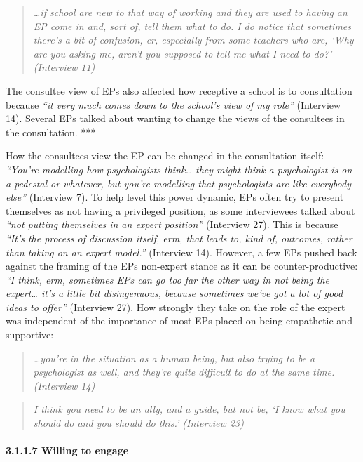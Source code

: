 \documentclass[
  english,
  man]{apa7}
\let\oldparagraph\paragraph
\renewcommand{\paragraph}[1]{\oldparagraph{#1}\mbox{}}
\begin{document}
\begin{quote}
\emph{\ldots if school are new to that way of working and they are used to having
an EP come in and, sort of, tell them what to do. I do notice that
sometimes there's a bit of confusion, er, especially from some
teachers who are, `Why are you asking me, aren't you supposed to tell
me what I need to do?' (Interview 11)}
\end{quote}

The consultee view of EPs also affected how receptive a school is to consultation because \emph{``it very much comes down to the school's view of my role''} (Interview 14). Several EPs talked about wanting to change the views of the consultees in the consultation. ***

How the consultees view the EP can be changed in the consultation itself: \emph{``You're modelling how psychologists think\ldots{} they might think a psychologist is on a pedestal or whatever, but you're modelling that psychologists are like everybody else''} (Interview 7). To help level this power dynamic, EPs often try to present themselves as not having a privileged position, as some interviewees talked about \emph{``not putting themselves in an expert position''} (Interview 27). This is because \emph{``It's the process of discussion itself, erm, that leads to, kind of, outcomes, rather than taking on an expert model.''} (Interview 14). However, a few EPs pushed back against the framing of the EPs non-expert stance as it can be counter-productive: \emph{``I think, erm, sometimes EPs can go too far the other way in not being the expert\ldots{} it's a little bit disingenuous, because sometimes we've got a lot of good ideas to offer''} (Interview 27). How strongly they take on the role of the expert was independent of the importance of most EPs placed on being empathetic and supportive:

\begin{quote}
\emph{\ldots you're in the situation as a human being, but also trying to be a
psychologist as well, and they're quite difficult to do at the same
time. (Interview 14)}
\end{quote}

\begin{quote}
\emph{I think you need to be an ally, and a guide, but not be, `I know what
you should do and you should do this.' (Interview 23)}
\end{quote}

\hypertarget{willing-to-engage}{%
\paragraph{3.1.1.7 Willing to engage}\label{willing-to-engage}}
\end{document}
